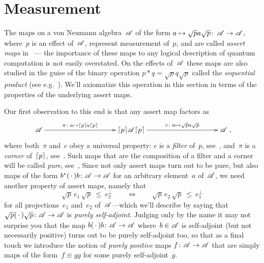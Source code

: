 \documentclass[a]{subfiles}
\begin{document}
\section{Measurement}
\label{S:measurement}
\begin{parsec}%
\begin{point}%
The maps on a von Neumann algebra~$\mathscr{A}$
of the form
$a\mapsto \sqrt{p}a\sqrt{p}\colon\,\mathscr{A}\to\mathscr{A}$,
where~$p$ is an effect of~$\mathscr{A}$,
represent measurement of~$p$,
and are called \emph{assert maps} in~\cite{newdirections}
--- the importance of these maps 
to any logical description of
quantum computation is not easily overstated.
On the effects of~$\mathscr{A}$
these maps are also  studied 
in the guise
of the binary operation
$p\ast q=\sqrt{p} q \sqrt{p}$
called the \emph{sequential product}
(see e.g.~\cite{gudder2002sequential}).
We'll axiomatize this operation
in this section
in terms of the properties 
of the underlying assert maps.

Our first observation
to this end
is that any assert map factors as
\begin{equation*}
\xymatrix@C=10em{
\scrA
\ar[r]^-{\pi\colon a\mapsto \ceil{p}a\ceil{p}}
&
\ceil{p}\!\scrA\!\ceil{p}
\ar[r]^-{c\colon a\mapsto \sqrt{p}a\sqrt{p}}
&
\scrA
},
\end{equation*}
where both~$\pi$ and~$c$ obey a universal property:
$c$ is a \emph{filter} of~$p$, see~,
and~$\pi$ is a \emph{corner} of~$\left\lceil p\right\rceil$, see~.
Such maps
that are the composition of a filter and a corner
will be called \emph{pure}, see~,
Since not only assert maps turn out to be pure, but also maps of the form
$b^*(\,\cdot\,)b\colon \mathscr{A}\to\mathscr{A}$ for an arbitrary element~$a$
of~$\mathscr{A}$,
we need another property of assert maps, namely
that
\begin{equation*}
	\sqrt{p}\,e_1\,\sqrt{p}\ \leq\  e_2^\perp 
	\qquad\iff\qquad
	\sqrt{p}\,e_2 \,\sqrt{p}\ \leq\  e_1^\perp
\end{equation*}
for all projections~$e_1$ and~$e_2$ of~$\mathscr{A}$---which we'll
describe by saying that $\sqrt{p}(\,\cdot\,)\sqrt{p}\colon \mathscr{A}\to\mathscr{A}$
is \emph{purely self-adjoint}.
Judging only by the name
it may not surprise you that the map $b(\,\cdot\,)b\colon \mathscr{A}\to\mathscr{A}$
where~$b\in \mathscr{A}$ is self-adjoint (but not necessarily positive)
turns out to be purely self-adjoint too,
so that as a final touch we introduce the notion
of \emph{purely positive} maps $f\colon \mathscr{A}\to\mathscr{A}$
that are simply maps of the form~$f\equiv gg$ for some purely self-adjoint~$g$.


\end{point}
\end{parsec}
\end{document}
